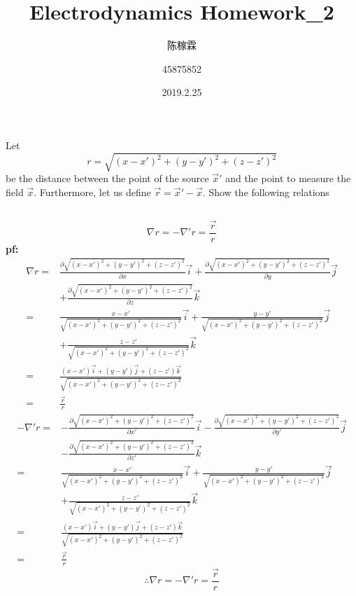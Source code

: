 \documentclass[10pt,a4paper]{article}
\title{Electrodynamics Homework\_2}
\author{陈稼霖 \and 45875852}
\date{2019.2.25}
\begin{document}
\maketitle
\section{}
Let
\[
r=\sqrt{(x-x')^2+(y-y')^2+(z-z')^2}
\]
be the distance between the point of the source $\vec{x}'$ and the point to measure the field $\vec{x}$. Furthermore, let us define $\vec{r}=\vec{x}'-\vec{x}$. Show the following relations
\subsection{}
\[
\nabla r=-\nabla'r=\frac{\vec{r}}{r}
\]
\textbf{pf:}
\footnotesize\begin{align*}
\nabla r=&\frac{\partial\sqrt{(x-x')^2+(y-y')^2+(z-z')^2}}{\partial x}\vec{i}+\frac{\partial\sqrt{(x-x')^2+(y-y')^2+(z-z')^2}}{\partial y}\vec{j}\\
&+\frac{\partial\sqrt{(x-x')^2+(y-y')^2+(z-z')^2}}{\partial z}\vec{k}\\
=&\frac{x-x'}{\sqrt{(x-x')^2+(y-y')^2+(z-z')^2}}\vec{i}+\frac{y-y'}{\sqrt{(x-x')^2+(y-y')^2+(z-z')^2}}\vec{j}\\
&+\frac{z-z'}{\sqrt{(x-x')^2+(y-y')^2+(z-z')^2}}\vec{k}\\
=&\frac{(x-x')\vec{i}+(y-y')\vec{j}+(z-z')\vec{k}}{\sqrt{(x-x')^2+(y-y')^2+(z-z')^2}}\\
=&\frac{\vec{r}}{r}
\end{align*}
\begin{align*}
-\nabla'r=&-\frac{\partial\sqrt{(x-x')^2+(y-y')^2+(z-z')^2}}{\partial x'}\vec{i}-\frac{\partial\sqrt{(x-x')^2+(y-y')^2+(z-z')^2}}{\partial y'}\vec{j}\\
&-\frac{\partial\sqrt{(x-x')^2+(y-y')^2+(z-z')^2}}{\partial z'}\vec{k}\\
=&\frac{x-x'}{\sqrt{(x-x')^2+(y-y')^2+(z-z')^2}}\vec{i}+\frac{y-y'}{\sqrt{(x-x')^2+(y-y')^2+(z-z')^2}}\vec{j}\\
&+\frac{z-z'}{\sqrt{(x-x')^2+(y-y')^2+(z-z')^2}}\vec{k}\\
=&\frac{(x-x')\vec{i}+(y-y')\vec{j}+(z-z')\vec{k}}{\sqrt{(x-x')^2+(y-y')^2+(z-z')^2}}\\
=&\frac{\vec{r}}{r}
\end{align*}\normalsize
\[
\therefore\nabla r=-\nabla'r=\frac{\vec{r}}{r}
\]
\end{document}
